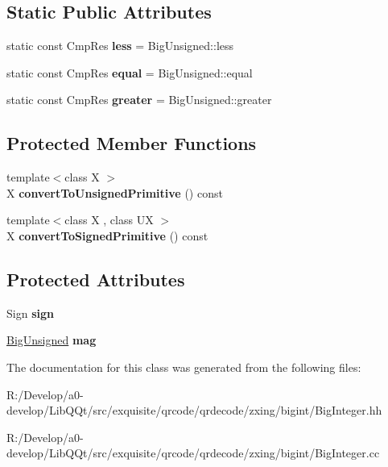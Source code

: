 \subsection*{Static Public Attributes}
\begin{DoxyCompactItemize}
\item 
\mbox{\label{class_big_integer_a33d12d768a6a6cc0ac55f1d5d3a3bf85}} 
static const Cmp\+Res {\bfseries less} = Big\+Unsigned\+::less
\item 
\mbox{\label{class_big_integer_a6af9bee51f320bbfb3138ade782d265f}} 
static const Cmp\+Res {\bfseries equal} = Big\+Unsigned\+::equal
\item 
\mbox{\label{class_big_integer_a58d296e453689114fe92b551a3a4ad28}} 
static const Cmp\+Res {\bfseries greater} = Big\+Unsigned\+::greater
\end{DoxyCompactItemize}
\subsection*{Protected Member Functions}
\begin{DoxyCompactItemize}
\item 
\mbox{\label{class_big_integer_a2960977fc2ba07a5d455103a88f9581e}} 
{\footnotesize template$<$class X $>$ }\\X {\bfseries convert\+To\+Unsigned\+Primitive} () const
\item 
\mbox{\label{class_big_integer_a02e00ce8c8f2826c06eab357342efb35}} 
{\footnotesize template$<$class X , class UX $>$ }\\X {\bfseries convert\+To\+Signed\+Primitive} () const
\end{DoxyCompactItemize}
\subsection*{Protected Attributes}
\begin{DoxyCompactItemize}
\item 
\mbox{\label{class_big_integer_a7504893ed5d8928d99c03e92c0727ed6}} 
Sign {\bfseries sign}
\item 
\mbox{\label{class_big_integer_a892d9475055eb633b56bf1e4c7094352}} 
\mbox{\hyperlink{class_big_unsigned}{Big\+Unsigned}} {\bfseries mag}
\end{DoxyCompactItemize}


The documentation for this class was generated from the following files\+:\begin{DoxyCompactItemize}
\item 
R\+:/\+Develop/a0-\/develop/\+Lib\+Q\+Qt/src/exquisite/qrcode/qrdecode/zxing/bigint/Big\+Integer.\+hh\item 
R\+:/\+Develop/a0-\/develop/\+Lib\+Q\+Qt/src/exquisite/qrcode/qrdecode/zxing/bigint/Big\+Integer.\+cc\end{DoxyCompactItemize}
